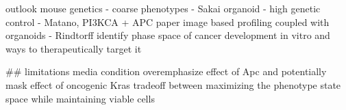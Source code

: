 outlook 
mouse genetics - coarse phenotypes  - Sakai
organoid - high genetic control - Matano, PI3KCA + APC paper
image based profiling coupled with organoids - Rindtorff
identify phase space of cancer development in vitro and ways to therapeutically target it


## limitations
media condition overemphasize effect of Apc and potentially mask effect of oncogenic Kras
tradeoff between maximizing the phenotype state space while maintaining viable cells 